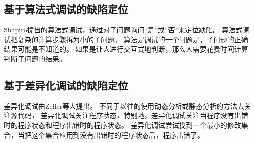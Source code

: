 \subsection{基于算法式调试的缺陷定位}

Shapiro提出的算法式调试\parencite{Shapiro1982Algorithmic}，通过对子问题询问“是”或“否”来定位缺陷。
算法式调试把复杂的计算步骤拆为小的子问题。
算法是调试的一个问题是，子问题的正确结果可能是不知道的。
如果是让人进行交互式地判断，那么人需要花费时间计算判断子问题的结果。

\subsection{基于差异化调试的缺陷定位}

差异化调试由Zeller等人提出\parencite{Zeller2002Isolating,Zeller2002Simplifying}。
不同于以往的使用动态分析或静态分析的方法去关注源代码，
差异化调试关注程序状态，特别地，差异化调试关注当程序没有出错时的程序状态和程序出错时的程序状态。
差异化调试尝试找到一个最小的修改集合，当把这个集合应用到没有出错时的程序状态后，程序出错了。

